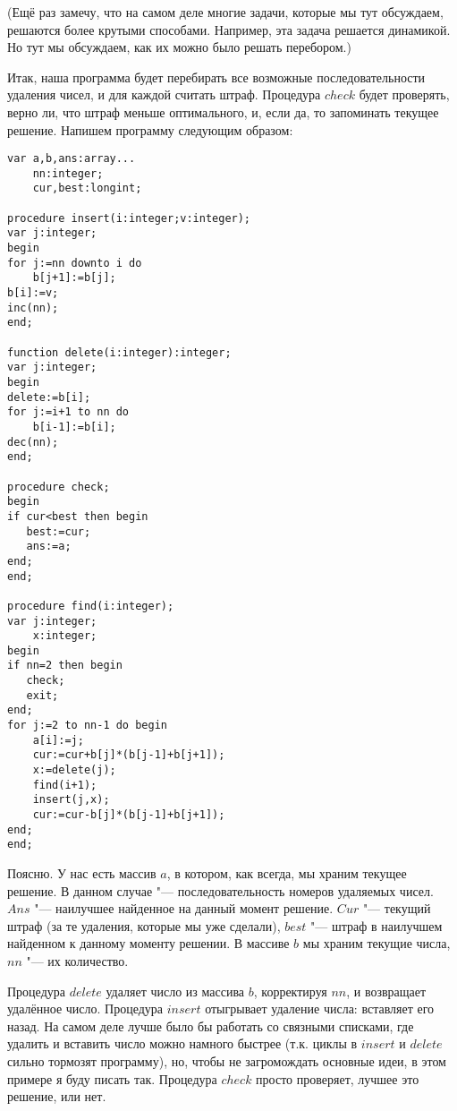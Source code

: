 (Ещё раз замечу, что на самом деле многие задачи, которые мы тут обсуждаем, решаются более крутыми 
способами. Например, эта задача решается динамикой. Но тут мы обсуждаем, как их можно было 
решать перебором.)

Итак, наша программа будет перебирать все возможные последовательности удаления чисел, и для 
каждой считать штраф. Процедура $check$ будет проверять, верно ли, что штраф меньше 
оптимального, и, если да, то запоминать текущее решение. Напишем программу следующим образом:

\begin{codesample}\begin{verbatim}
var a,b,ans:array...
    nn:integer;
    cur,best:longint;

procedure insert(i:integer;v:integer);
var j:integer;
begin
for j:=nn downto i do
    b[j+1]:=b[j];
b[i]:=v;
inc(nn);
end;

function delete(i:integer):integer;
var j:integer;
begin
delete:=b[i];
for j:=i+1 to nn do
    b[i-1]:=b[i];
dec(nn);
end;

procedure check;
begin
if cur<best then begin
   best:=cur;
   ans:=a;
end;
end;

procedure find(i:integer);
var j:integer;
    x:integer;
begin
if nn=2 then begin
   check;
   exit;
end;
for j:=2 to nn-1 do begin
    a[i]:=j;
    cur:=cur+b[j]*(b[j-1]+b[j+1]);
    x:=delete(j);
    find(i+1);
    insert(j,x);
    cur:=cur-b[j]*(b[j-1]+b[j+1]);
end;
end;
\end{verbatim}\end{codesample}

Поясню. У нас есть массив $a$, в котором, как всегда, мы храним текущее решение. В
данном случае "--- последовательность номеров удаляемых чисел. $Ans$ "--- наилучшее
найденное на данный момент решение. $Cur$ "--- текущий штраф (за те удаления,
которые мы уже сделали), $best$ "--- штраф в наилучшем найденном к данному моменту
решении. В массиве $b$ мы храним текущие числа, $nn$ "--- их количество. 

Процедура
$delete$ удаляет число из массива $b$, корректируя $nn$, и возвращает удалённое число.
Процедура $insert$ отыгрывает удаление числа: вставляет его назад. На самом деле
лучше было бы работать со связными списками, где удалить и вставить число можно
намного быстрее (т.к. циклы в $insert$ и $delete$ сильно тормозят
программу), но, чтобы не загромождать основные идеи, в этом примере я буду
писать так. Процедура $check$ просто проверяет, лучшее это решение, или нет. 

